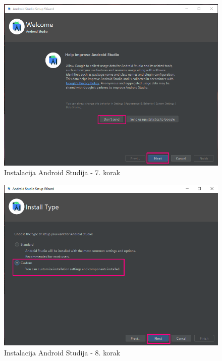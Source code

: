 \documentclass[11pt,a4paper,twoside]{article}
\begin{document}
\begin{figure}[!h]
	\centering
	\includegraphics[width=\textwidth]{install_07.png}
	\caption{Instalacija Android Studija - 7. korak}
	\label{fig:install_07}	
\end{figure}

\begin{figure}[!h]
	\centering
	\includegraphics[width=\textwidth]{install_08.png}
	\caption{Instalacija Android Studija - 8. korak}
	\label{fig:install_08}	
\end{figure}
\end{document}
